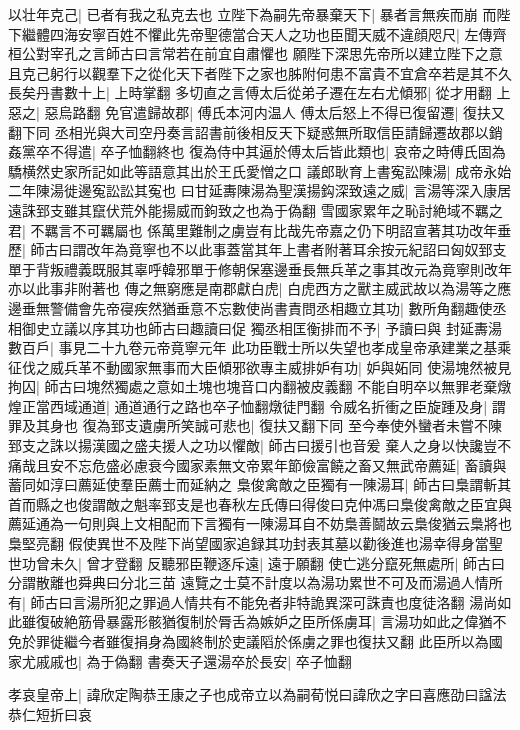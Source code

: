 以壮年克己|{
	已者有我之私克去也}
立陛下為嗣先帝暴棄天下|{
	暴者言無疾而崩}
而陛下繼體四海安寧百姓不懼此先帝聖德當合天人之功也臣聞天威不違顔咫尺|{
	左傳齊桓公對宰孔之言師古曰言常若在前宜自肅懼也}
願陛下深思先帝所以建立陛下之意且克己躬行以觀羣下之從化天下者陛下之家也胏附何患不富貴不宜倉卒若是其不久長矣丹書數十上|{
	上時掌翻}
多切直之言傅太后從弟子遷在左右尤傾邪|{
	從才用翻}
上惡之|{
	惡烏路翻}
免官遣歸故郡|{
	傅氏本河内温人}
傅太后怒上不得已復留遷|{
	復扶又翻下同}
丞相光與大司空丹奏言詔書前後相反天下疑惑無所取信臣請歸遷故郡以銷姦黨卒不得遣|{
	卒子恤翻終也}
復為侍中其逼於傅太后皆此類也|{
	哀帝之時傅氏固為驕横然史家所記如此等語意其出於王氏愛憎之口}
議郎耿育上書寃訟陳湯|{
	成帝永始二年陳湯徙邊寃訟訟其寃也}
曰甘延夀陳湯為聖漢揚鈎深致遠之威|{
	言湯等深入康居遠誅郅支雖其竄伏荒外能揚威而鉤致之也為于偽翻}
雪國家累年之恥討絶域不羈之君|{
	不羈言不可羈屬也}
係萬里難制之虜豈有比哉先帝嘉之仍下明詔宣著其功改年垂歷|{
	師古曰謂改年為竟寧也不以此事蓋當其年上書者附著耳余按元紀詔曰匈奴郅支單于背叛禮義既服其辜呼韓邪單于修朝保塞邊垂長無兵革之事其改元為竟寧則改年亦以此事非附著也}
傳之無窮應是南郡獻白虎|{
	白虎西方之獸主威武故以為湯等之應}
邊垂無警備會先帝寑疾然猶垂意不忘數使尚書責問丞相趣立其功|{
	數所角翻趣使丞相御史立議以序其功也師古曰趣讀曰促}
獨丞相匡衡排而不予|{
	予讀曰與}
封延夀湯數百戶|{
	事見二十九卷元帝竟寧元年}
此功臣戰士所以失望也孝成皇帝承建業之基乘征伐之威兵革不動國家無事而大臣傾邪欲專主威排妒有功|{
	妒與妬同}
使湯塊然被見拘囚|{
	師古曰塊然獨處之意如土塊也塊音口内翻被皮義翻}
不能自明卒以無罪老棄燉煌正當西域通道|{
	通道通行之路也卒子恤翻燉徒門翻}
令威名折衝之臣旋踵及身|{
	謂罪及其身也}
復為郅支遺虜所笑誠可悲也|{
	復扶又翻下同}
至今奉使外蠻者未嘗不陳郅支之誅以揚漢國之盛夫援人之功以懼敵|{
	師古曰援引也音爰}
棄人之身以快讒豈不痛哉且安不忘危盛必慮衰今國家素無文帝累年節儉富饒之畜又無武帝薦延|{
	畜讀與蓄同如淳曰薦延使羣臣薦士而延納之}
梟俊禽敵之臣獨有一陳湯耳|{
	師古曰梟謂斬其首而縣之也俊謂敵之魁率郅支是也春秋左氏傳曰得俊曰克仲馮曰梟俊禽敵之臣宜與薦延通為一句則與上文相配而下言獨有一陳湯耳自不妨梟善鬬故云梟俊猶云梟將也梟堅亮翻}
假使異世不及陛下尚望國家追録其功封表其墓以勸後進也湯幸得身當聖世功曾未久|{
	曾才登翻}
反聽邪臣鞭逐斥遠|{
	遠于願翻}
使亡逃分竄死無處所|{
	師古曰分謂散離也舜典曰分北三苗}
遠覽之士莫不計度以為湯功累世不可及而湯過人情所有|{
	師古曰言湯所犯之罪過人情共有不能免者非特詭異深可誅責也度徒洛翻}
湯尚如此雖復破絶筋骨暴露形骸猶復制於脣舌為嫉妒之臣所係虜耳|{
	言湯功如此之偉猶不免於罪徙繼今者雖復捐身為國終制於吏議䧟於係虜之罪也復扶又翻}
此臣所以為國家尤戚戚也|{
	為于偽翻}
書奏天子還湯卒於長安|{
	卒子恤翻}


孝哀皇帝上|{
	諱欣定陶恭王康之子也成帝立以為嗣荀悦曰諱欣之字曰喜應劭曰諡法恭仁短折曰哀}


